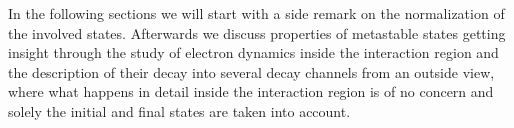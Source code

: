 In the following sections we will start with a side remark on the normalization
of the involved states. Afterwards we discuss properties of metastable states
getting insight through the study of electron dynamics inside the interaction
region
and the description of their decay into several decay channels from an outside
view, where what happens in detail inside the interaction region is of no
concern and solely the initial and final states are taken into account.

%
%
%



\begin{figure}[h]
  \centering
  
  \caption{}
  \label{}
\end{figure}


